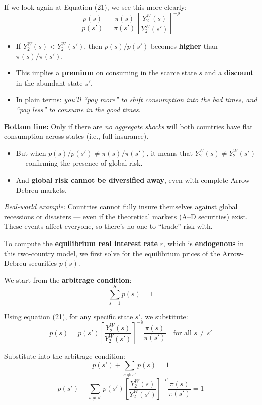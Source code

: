 \documentclass[12pt]{article}
\begin{document}
If we look again at Equation (21), we see this more clearly:
\[
\frac{p(s)}{p(s')} = \frac{\pi(s)}{\pi(s')} \left[ \frac{Y_2^W(s)}{Y_2^W(s')} \right]^{-\rho}
\]

\begin{itemize}
    \item If $Y_2^W(s) < Y_2^W(s')$, then $p(s)/p(s')$ becomes \textbf{higher} than $\pi(s)/\pi(s')$.
    \item This implies a \textbf{premium} on consuming in the scarce state $s$ and a \textbf{discount} in the abundant state $s'$.
    \item In plain terms: \textit{you’ll “pay more” to shift consumption into the bad times, and “pay less” to consume in the good times}.
\end{itemize}

\vspace{0.5em}

\textbf{Bottom line:} Only if there are \textit{no aggregate shocks} will both countries have flat consumption across states (i.e., full insurance). 

\begin{itemize}
    \item But when $p(s)/p(s') \neq \pi(s)/\pi(s')$, it means that $Y_2^W(s) \neq Y_2^W(s')$ — confirming the presence of global risk.
    \item And \textbf{global risk cannot be diversified away}, even with complete Arrow–Debreu markets.
\end{itemize}

\textit{Real-world example:} Countries cannot fully insure themselves against global recessions or disasters — even if the theoretical markets (A–D securities) exist. These events affect everyone, so there’s no one to “trade” risk with.


To compute the \textbf{equilibrium real interest rate} \( r \), which is \textbf{endogenous} in this two-country model, we first solve for the equilibrium prices of the Arrow-Debreu securities \( p(s) \).

We start from the \textbf{arbitrage condition}:
\[
\sum_{s=1}^S p(s) = 1
\]

Using equation (21), for any specific state \( s' \), we substitute:
\[
p(s) = p(s') \left[ \frac{Y_2^W(s)}{Y_2^W(s')} \right]^{-\rho} \frac{\pi(s)}{\pi(s')} \quad \text{for all } s \neq s'
\]

Substitute into the arbitrage condition:
\[
p(s') + \sum_{s \neq s'} p(s) = 1
\]
\[
p(s') + \sum_{s \neq s'} p(s') \left[ \frac{Y_2^W(s)}{Y_2^W(s')} \right]^{-\rho} \frac{\pi(s)}{\pi(s')} = 1
\]
\end{document}
